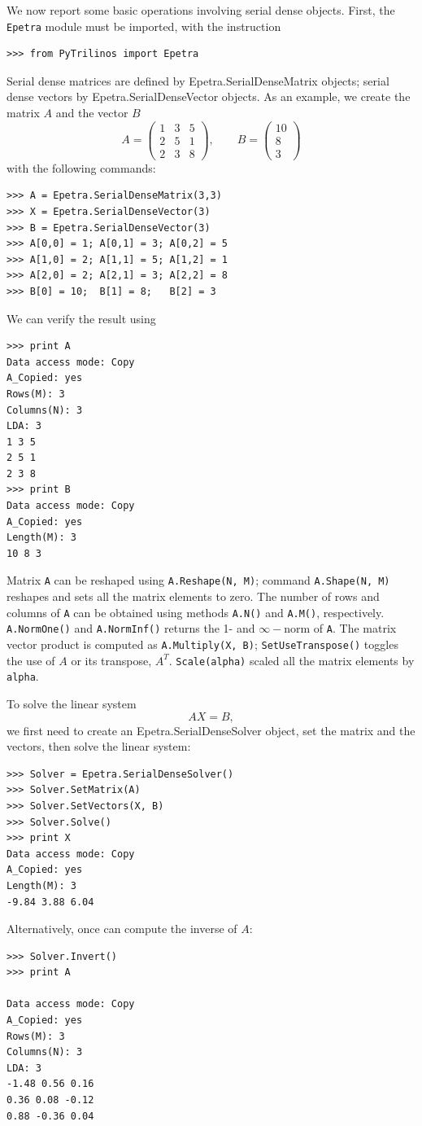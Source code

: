 \documentclass[10pt,relax]{SANDreport}
\begin{document}
We now report some basic operations involving serial dense objects. First, 
the {\tt Epetra} module must be imported, with the instruction
\begin{verbatim}
>>> from PyTrilinos import Epetra
\end{verbatim}
Serial dense matrices are defined by Epetra.SerialDenseMatrix objects; serial
dense vectors by Epetra.SerialDenseVector objects. As an example, 
we create the matrix $A$ and the vector $B$
\[
A = 
\begin{pmatrix}
1 & 3 & 5 \\
2 & 5 & 1 \\
2 & 3 & 8
\end{pmatrix}
, \quad \quad
B = 
\begin{pmatrix}
10 \\
  8 \\
  3
\end{pmatrix}
\]
with the following commands:
\begin{verbatim}
>>> A = Epetra.SerialDenseMatrix(3,3)
>>> X = Epetra.SerialDenseVector(3)
>>> B = Epetra.SerialDenseVector(3)
>>> A[0,0] = 1; A[0,1] = 3; A[0,2] = 5
>>> A[1,0] = 2; A[1,1] = 5; A[1,2] = 1
>>> A[2,0] = 2; A[2,1] = 3; A[2,2] = 8
>>> B[0] = 10;  B[1] = 8;   B[2] = 3
\end{verbatim}
We can  verify the result using 
\begin{verbatim}
>>> print A
Data access mode: Copy
A_Copied: yes
Rows(M): 3
Columns(N): 3
LDA: 3
1 3 5
2 5 1
2 3 8
>>> print B
Data access mode: Copy
A_Copied: yes
Length(M): 3
10 8 3 
\end{verbatim}
Matrix {\tt A} can be reshaped using \verb!A.Reshape(N, M)!; command
\verb!A.Shape(N, M)! reshapes and sets all the matrix elements to zero.  The
number of rows and columns of {\tt A} can be obtained using methods
\verb!A.N()! and \verb!A.M()!, respectively. \verb!A.NormOne()! and
\verb!A.NormInf()!  returns the 1- and $\infty-$norm of {\tt A}. The matrix
vector product is computed as \verb!A.Multiply(X, B)!;
\verb!SetUseTranspose()! toggles the use of $A$ or its transpose, $A^T$.
\verb!Scale(alpha)! scaled all the matrix elements by \verb!alpha!.

To solve the linear system
\begin{equation}
\label{eq:lin_sys}
A X = B,
\end{equation}
we first need to create an Epetra.SerialDenseSolver object, set the matrix and the vectors,
  then solve the linear system:
\begin{verbatim}
>>> Solver = Epetra.SerialDenseSolver()
>>> Solver.SetMatrix(A)
>>> Solver.SetVectors(X, B)
>>> Solver.Solve()
>>> print X
Data access mode: Copy
A_Copied: yes
Length(M): 3
-9.84 3.88 6.04 
\end{verbatim}
Alternatively, once can compute the inverse of $A$:
\begin{verbatim}
>>> Solver.Invert()
>>> print A

Data access mode: Copy
A_Copied: yes
Rows(M): 3
Columns(N): 3
LDA: 3
-1.48 0.56 0.16 
0.36 0.08 -0.12 
0.88 -0.36 0.04 
\end{verbatim}
\end{document}
